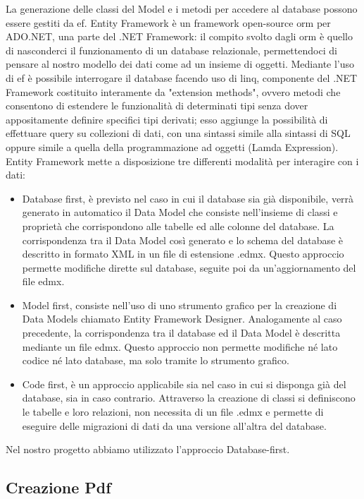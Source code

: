La generazione delle classi del Model e i metodi per accedere al database possono essere gestiti da \Gls{ef}.
Entity Framework è un framework open-source \Gls{orm} per ADO.NET, una parte del .NET Framework: il compito svolto dagli \Gls{orm} è quello di nasconderci il funzionamento di un database relazionale, permettendoci di pensare al nostro modello dei dati come ad un insieme di oggetti.
Mediante l'uso di \Gls{ef} è possibile interrogare il database facendo uso di \Gls{linq}, componente del .NET Framework costituito interamente da "extension methods", ovvero metodi che consentono di estendere le funzionalità di determinati tipi senza dover appositamente definire specifici tipi derivati; esso aggiunge la possibilità di effettuare query su collezioni di dati, con una sintassi simile alla sintassi di SQL oppure simile a quella della programmazione ad oggetti (Lamda Expression).
Entity Framework mette a disposizione tre differenti modalità per interagire con i dati:
\begin{itemize}
    \item Database first, è previsto nel caso in cui il database sia già disponibile, verrà generato in automatico il Data Model che consiste nell'insieme di classi e proprietà che corrispondono alle tabelle ed alle colonne del database. La corrispondenza tra il Data Model così generato e lo schema del database è descritto in formato XML in un file di estensione .edmx. Questo approccio permette modifiche dirette sul database, seguite poi da un'aggiornamento del file edmx.
    \item Model first, consiste nell'uso di uno strumento grafico per la creazione di Data Models chiamato Entity Framework Designer. Analogamente al caso precedente, la corrispondenza tra il database ed il Data Model è descritta mediante un file edmx. Questo approccio non permette modifiche né lato codice né lato database, ma solo tramite lo strumento grafico.
    \item Code first, è un approccio applicabile sia nel caso in cui si disponga già del database, sia in caso contrario. Attraverso la creazione di classi si definiscono le tabelle e loro relazioni, non necessita di un file .edmx e permette di eseguire delle migrazioni di dati da una versione all'altra del database.
\end{itemize}
Nel nostro progetto abbiamo utilizzato l'approccio Database-first.



\subsection{Creazione Pdf}

